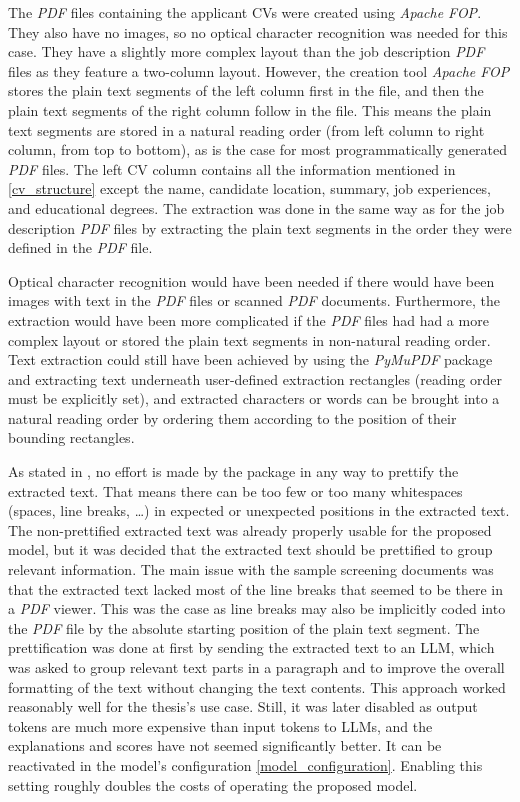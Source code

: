 \documentclass[draft,final]{thesisclass} %
\begin{document}
The \textit{PDF} files containing the applicant \acs{CV}s were created using \textit{Apache FOP}. They also have no images, so no optical character recognition was needed for this case.
They have a slightly more complex layout than the job description \textit{PDF} files as they feature a two-column layout.
However, the creation tool \textit{Apache FOP} stores the plain text segments of the left column first in the  file, and then the plain text segments of the right column follow in the file.
This means the plain text segments are stored in a natural reading order (from left column to right column, from top to bottom), as is the case for most programmatically generated \textit{PDF} files.
The left \acs{CV} column contains all the information mentioned in \ref{cv_structure} except the name, candidate location, summary, job experiences, and educational degrees.
The extraction was done in the same way as for the job description \textit{PDF} files by extracting the plain text segments in the order they were defined in the \textit{PDF} file.

Optical character recognition would have been needed if there would have been images with text in the \textit{PDF} files or scanned \textit{PDF} documents.
Furthermore, the extraction would have been more complicated if the \textit{PDF} files had had a more complex layout or stored the plain text segments in non-natural reading order.
Text extraction could still have been achieved by using the \textit{PyMuPDF} package and extracting text underneath user-defined extraction rectangles (reading order must be explicitly set), and extracted characters or words can be brought into a natural reading order by ordering them according to the position of their bounding rectangles.

As stated in \textcite{pymupdf}, no effort is made by the package in any way to prettify the extracted text.
That means there can be too few or too many whitespaces (spaces, line breaks, \dots) in expected or unexpected positions in the extracted text.
The non-prettified extracted text was already properly usable for the proposed model, but it was decided that the extracted text should be prettified to group relevant information.
The main issue with the sample screening documents was that the extracted text lacked most of the line breaks that seemed to be there in a \textit{PDF} viewer.
This was the case as line breaks may also be implicitly coded into the \textit{PDF} file by the absolute starting position of the plain text segment.
The prettification was done at first by sending the extracted text to an \gls{LLM}, which was asked to group relevant text parts in a paragraph and to improve the overall formatting of the text without changing the text contents.
This approach worked reasonably well for the thesis's use case. Still, it was later disabled as output tokens are much more expensive than input tokens to \gls{LLM}s, and the explanations and scores have not seemed significantly better. It can be reactivated in the model's configuration \ref{model_configuration}.
Enabling this setting roughly doubles the costs of operating the proposed model.
\end{document}
